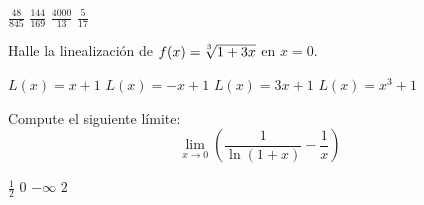 \begin{alternativas}
   \alternativaCorrecta$\frac{48}{845}$
   \alternativa $\frac{144}{169}$
   \alternativa $\frac{4000}{13}$
   \alternativa $\frac{5}{17}$
\end{alternativas}
%
\pregunta[5]
Halle la linealización de $f(x) = \sqrt[\leftroot{2}\uproot{2}3]{1+3x}$ en $x=0$.
\mostrarpuntaje

\begin{alternativas}
   \alternativaCorrecta$L(x) = x + 1$
   \alternativa $L(x) = -x + 1$
   \alternativa $L(x) = 3x + 1$
   \alternativa $L(x) = x^3 + 1$
\end{alternativas}
%
\pregunta[5]
Compute el siguiente límite:
$$\lim_{x\to0}\left(\frac{1}{\ln{(1+x)}}-\frac{1}{x}\right)$$
\mostrarpuntaje

\begin{alternativas}
   \alternativaCorrecta$\frac{1}{2}$
   \alternativa $0$
   \alternativa $-\infty$
   \alternativa $2$
\end{alternativas}

